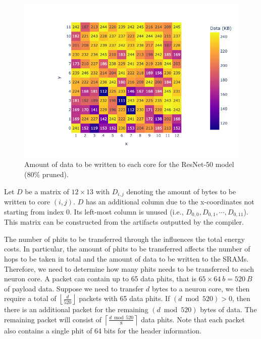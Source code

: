 \begin{figure}[hbtp]
    \centering
    \includegraphics[width=0.8\linewidth]{assets/model_data_heatmap.png}
    \caption{Amount of data to be written to each core for the ResNet-50 model (80\% pruned).}
    \label{fig:model_data_heapmap}
\end{figure}

Let $D$ be a matrix of $12 \times 13$ with $D_{i,j}$ denoting the amount of bytes to be written to core $\left( i,j \right)$.
$D$ has an additional column due to the x-coordinates not starting from index $0$.
Its left-most column is unused (i.e., $D_{0,0}, D_{0,1}, \cdots, D_{0,11}$).
This matrix can be constructed from the artifacts outputted by the compiler.

The number of phits to be transferred through the \confignoc{} influences the total energy costs.
In particular, the amount of phits to be transferred affects the number of hops to be taken in total and the amount of data to be written to the SRAMs.
Therefore, we need to determine how many phits needs to be transferred to each neuron core.
A packet can contain up to 65 data phits, that is $65 \times \SI{64}{b} = \SI{520}{B}$ of payload data.
Suppose we need to transfer $d$ bytes to a neuron core, we then require a total of $\left\lfloor \frac{d}{520} \right\rfloor$ packets with 65 data phits.
If $\left( d \bmod 520 \right) > 0$, then there is an additional packet for the remaining $\left( d \bmod 520 \right)$ bytes of data.
The remaining packet will consist of $\left\lceil \frac{d \bmod 520}{8}\right\rceil$ data phits.
Note that each packet also contains a single phit of 64 bits for the header information.


